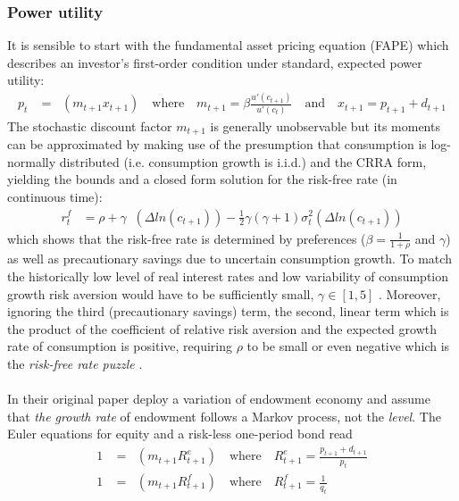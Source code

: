\subsubsection{Power utility} \label{Power utility}
It is sensible to start with the fundamental asset pricing equation (FAPE) which describes an investor's first-order condition under standard, expected power utility:
\begin{align*}
    p_t &= \mathop{\mathbb{E}_{t}} (m_{t+1} x_{t+1}) \quad \text{where} \quad m_{t+1} = \beta \frac{u'(c_{t+1})}{u'(c_{t})} \quad \text{and} \quad x_{t+1} = p_{t+1} + d_{t+1}
\end{align*}
The stochastic discount factor $m_{t+1}$ is generally unobservable but its moments can be approximated by making use of the presumption that consumption is log-normally distributed (i.e. consumption growth is i.i.d.) and the CRRA form, yielding the \citet{Hansen1991} bounds and a closed form solution for the risk-free rate (in continuous time):
\begin{align*}
    r_{t}^{f} &= \rho + \gamma \mathop{\mathbb{E}_{t}}(\Delta ln(c_{t+1})) - \frac{1}{2} \gamma (\gamma + 1) \sigma_{t}^{2} (\Delta ln(c_{t+1}))
\end{align*}
which shows that the risk-free rate is determined by preferences ($\beta = \frac{1}{1+\rho}$ and $\gamma$) as well as precautionary savings due to uncertain consumption growth. To match the historically low level of real interest rates and low variability of consumption growth risk aversion would have to be sufficiently small, $\gamma \in [1,5]$ \cite{Cochrane2005}. Moreover, ignoring the third (precautionary savings) term, the second, linear term which is the product of the coefficient of relative risk aversion and the expected growth rate of consumption is positive, requiring $\rho$ to be small or even negative which is the \textit{risk-free rate puzzle} \cite{Weil1989}.\\
\\
In their original paper \citet{Mehra1985} deploy a variation of \citet{Lucas1978} endowment economy and assume that \textit{the growth rate} of endowment follows a Markov process, not the \textit{level}. The Euler equations for equity and a risk-less one-period bond read
\begin{align*}
    1 &= \mathop{\mathbb{E}_{t}} (m_{t+1} R_{t+1}^{e}) \quad \text{where} \quad R_{t+1}^{e} = \frac{p_{t+1} + d_{t+1}}{p_{t}}\\
    1 &= \mathop{\mathbb{E}_{t}} (m_{t+1} R_{t+1}^{f}) \quad \text{where} \quad R_{t+1}^{f} = \frac{1}{q_t}
\end{align*}
